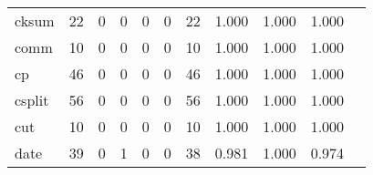 \begin{longtable}{lp{1.2cm}p{1.2cm}p{1.2cm}p{1.2cm}p{1.2cm}p{1.2cm}p{1.2cm}p{1.2cm}p{1.2cm}p{1.2cm}}
cksum     &                                    22 &                                                  0 &                                                  0 &                                                  0 &                                                  0 &                                                 22 &                                         1.000 &                                              1.000 &                                              1.000 \\
comm      &                                    10 &                                                  0 &                                                  0 &                                                  0 &                                                  0 &                                                 10 &                                         1.000 &                                              1.000 &                                              1.000 \\
cp        &                                    46 &                                                  0 &                                                  0 &                                                  0 &                                                  0 &                                                 46 &                                         1.000 &                                              1.000 &                                              1.000 \\
csplit    &                                    56 &                                                  0 &                                                  0 &                                                  0 &                                                  0 &                                                 56 &                                         1.000 &                                              1.000 &                                              1.000 \\
cut       &                                    10 &                                                  0 &                                                  0 &                                                  0 &                                                  0 &                                                 10 &                                         1.000 &                                              1.000 &                                              1.000 \\
date      &                                    39 &                                                  0 &                                                  1 &                                                  0 &                                                  0 &                                                 38 &                                         0.981 &                                              1.000 &                                              0.974 \\

\end{longtable}
